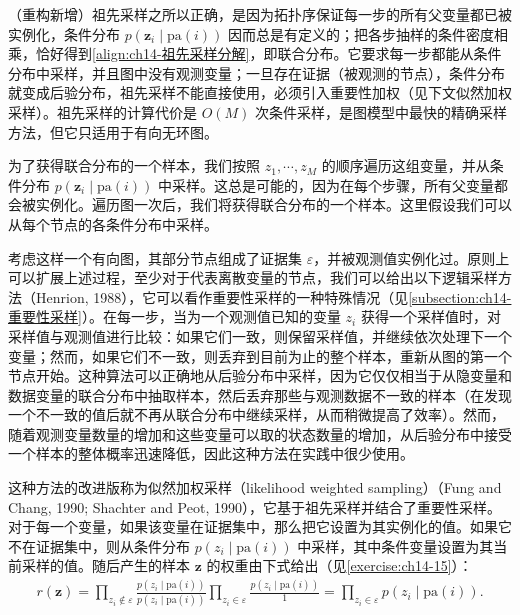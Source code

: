 \documentclass[../../main.tex]{subfiles}
\begin{document}
\begin{remark}（重构新增）祖先采样之所以正确，是因为拓扑序保证每一步的所有父变量都已被实例化，条件分布 $p\!\left(\bm{z}_{i}\mid\mathrm{pa}(i)\right)$ 因而总是有定义的；把各步抽样的条件密度相乘，恰好得到\eqref{align:ch14-祖先采样分解}，即联合分布。它要求每一步都能从条件分布中采样，并且图中没有观测变量；一旦存在证据（被观测的节点），条件分布就变成后验分布，祖先采样不能直接使用，必须引入重要性加权（见下文似然加权采样）。祖先采样的计算代价是 $O(M)$ 次条件采样，是图模型中最快的精确采样方法，但它只适用于有向无环图。
\end{remark}

为了获得联合分布的一个样本，我们按照 $z_{1},\cdots,z_{M}$ 的顺序遍历这组变量，并从条件分布 $p\!\left(\bm{z}_{i}\mid\mathrm{pa}(i)\right)$ 中采样。这总是可能的，因为在每个步骤，所有父变量都会被实例化。遍历图一次后，我们将获得联合分布的一个样本。这里假设我们可以从每个节点的各条件分布中采样。

考虑这样一个有向图，其部分节点组成了证据集 $\varepsilon$，并被观测值实例化过。原则上可以扩展上述过程，至少对于代表离散变量的节点，我们可以给出以下逻辑采样方法（Henrion, 1988），它可以看作重要性采样的一种特殊情况（见\cref{subsection:ch14-重要性采样}）。在每一步，当为一个观测值已知的变量 $z_{i}$ 获得一个采样值时，对采样值与观测值进行比较：如果它们一致，则保留采样值，并继续依次处理下一个变量；然而，如果它们不一致，则丢弃到目前为止的整个样本，重新从图的第一个节点开始。这种算法可以正确地从后验分布中采样，因为它仅仅相当于从隐变量和数据变量的联合分布中抽取样本，然后丢弃那些与观测数据不一致的样本（在发现一个不一致的值后就不再从联合分布中继续采样，从而稍微提高了效率）。然而，随着观测变量数量的增加和这些变量可以取的状态数量的增加，从后验分布中接受一个样本的整体概率迅速降低，因此这种方法在实践中很少使用。

这种方法的改进版称为似然加权采样（likelihood weighted sampling）（Fung and Chang, 1990; Shachter and Peot, 1990），它基于祖先采样并结合了重要性采样。对于每一个变量，如果该变量在证据集中，那么把它设置为其实例化的值。如果它不在证据集中，则从条件分布 $p\!\left(z_{i}\mid\mathrm{pa}(i)\right)$ 中采样，其中条件变量设置为其当前采样的值。随后产生的样本 $\bm{z}$ 的权重由下式给出（见\cref{exercise:ch14-15}）：
\begin{align}
r(\bm{z})=\prod_{z_{i}\notin\varepsilon}\frac{p\!\left(z_{i}\mid\mathrm{pa}(i)\right)}{p\!\left(z_{i}\mid\mathrm{pa}(i)\right)}\prod_{z_{i}\in\varepsilon}\frac{p\!\left(z_{i}\mid\mathrm{pa}(i)\right)}{1}=\prod_{z_{i}\in\varepsilon}p\!\left(z_{i}\mid\mathrm{pa}(i)\right).
\label{align:ch14-似然加权权重}
\end{align}
\end{document}
